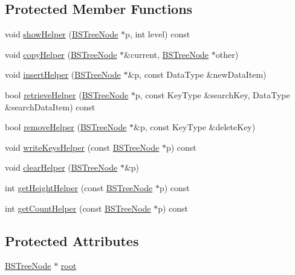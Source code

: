 \subsection*{Protected Member Functions}
\begin{DoxyCompactItemize}
\item 
void \hyperlink{class_b_s_tree_a44b3002e3476eb410468a4b9aaaa73ef}{show\+Helper} (\hyperlink{class_b_s_tree_1_1_b_s_tree_node}{B\+S\+Tree\+Node} $\ast$p, int level) const 
\item 
void \hyperlink{class_b_s_tree_a2833c786ee7ad54bad176d0d44dccf6c}{copy\+Helper} (\hyperlink{class_b_s_tree_1_1_b_s_tree_node}{B\+S\+Tree\+Node} $\ast$\&current, \hyperlink{class_b_s_tree_1_1_b_s_tree_node}{B\+S\+Tree\+Node} $\ast$other)
\item 
void \hyperlink{class_b_s_tree_a03c40a8e81d293f5dbeb4a35eaeb14ca}{insert\+Helper} (\hyperlink{class_b_s_tree_1_1_b_s_tree_node}{B\+S\+Tree\+Node} $\ast$\&p, const Data\+Type \&new\+Data\+Item)
\item 
bool \hyperlink{class_b_s_tree_a071fd2ff13c5ce3af48d46697eaddace}{retrieve\+Helper} (\hyperlink{class_b_s_tree_1_1_b_s_tree_node}{B\+S\+Tree\+Node} $\ast$p, const Key\+Type \&search\+Key, Data\+Type \&search\+Data\+Item) const 
\item 
bool \hyperlink{class_b_s_tree_af9e56aa85b0470c624dec325c780494f}{remove\+Helper} (\hyperlink{class_b_s_tree_1_1_b_s_tree_node}{B\+S\+Tree\+Node} $\ast$\&p, const Key\+Type \&delete\+Key)
\item 
void \hyperlink{class_b_s_tree_a2b949b501d86db3aa1d03b415f26582f}{write\+Keys\+Helper} (const \hyperlink{class_b_s_tree_1_1_b_s_tree_node}{B\+S\+Tree\+Node} $\ast$p) const 
\item 
void \hyperlink{class_b_s_tree_afb5d38809653f67dc423d8a8c6e9e106}{clear\+Helper} (\hyperlink{class_b_s_tree_1_1_b_s_tree_node}{B\+S\+Tree\+Node} $\ast$\&p)
\item 
int \hyperlink{class_b_s_tree_a0c13fd5ffd6a2fd777b7f67a6cf98390}{get\+Height\+Helper} (const \hyperlink{class_b_s_tree_1_1_b_s_tree_node}{B\+S\+Tree\+Node} $\ast$p) const 
\item 
int \hyperlink{class_b_s_tree_ae2e29d4350734ca0721b3907a31803ff}{get\+Count\+Helper} (const \hyperlink{class_b_s_tree_1_1_b_s_tree_node}{B\+S\+Tree\+Node} $\ast$p) const 
\end{DoxyCompactItemize}
\subsection*{Protected Attributes}
\begin{DoxyCompactItemize}
\item 
\hyperlink{class_b_s_tree_1_1_b_s_tree_node}{B\+S\+Tree\+Node} $\ast$ \hyperlink{class_b_s_tree_a83534afce9094181ac031f9f596a8625}{root}
\end{DoxyCompactItemize}



